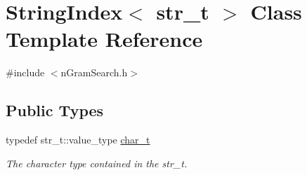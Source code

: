 \hypertarget{class_string_index}{}\section{String\+Index$<$ str\+\_\+t $>$ Class Template Reference}
\label{class_string_index}


{\ttfamily \#include $<$n\+Gram\+Search.\+h$>$}

\subsection*{Public Types}
\begin{DoxyCompactItemize}
\item 
\mbox{\label{class_string_index_a47f131c73d15a7c10c10a9748adf45dc}} 
typedef str\+\_\+t\+::value\+\_\+type \mbox{\hyperlink{class_string_index_a47f131c73d15a7c10c10a9748adf45dc}{char\+\_\+t}}
\begin{DoxyCompactList}\small\item\em The character type contained in the str\+\_\+t. \end{DoxyCompactList}\end{DoxyCompactItemize}
